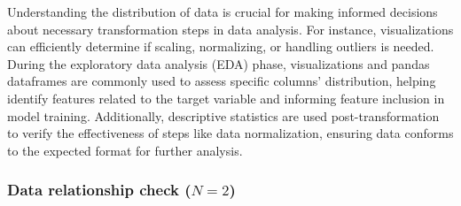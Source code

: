 Understanding the distribution of data is crucial for making informed decisions about necessary transformation steps in data analysis. For instance, visualizations can efficiently determine if scaling, normalizing, or handling outliers is needed. During the exploratory data analysis (EDA) phase, visualizations and pandas dataframes are commonly used to assess specific columns' distribution, helping identify features related to the target variable and informing feature inclusion in model training. Additionally, descriptive statistics are used post-transformation to verify the effectiveness of steps like data normalization, ensuring data conforms to the expected format for further analysis.


\subsubsection{Data relationship check ($N = 2$)}~\label{sec:linear-relation-output}

